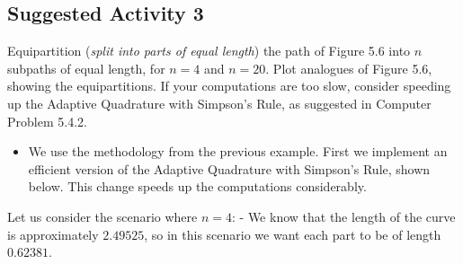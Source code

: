 \documentclass[11pt]{article}
\providecommand{\tightlist}{%
      \setlength{\itemsep}{0pt}\setlength{\parskip}{0pt}}
\begin{document}
    \subsection{Suggested Activity 3}\label{suggested-activity-3}

Equipartition (\emph{split into parts of equal length}) the path of
Figure 5.6 into \(n\) subpaths of equal length, for \(n = 4\) and
\(n = 20\). Plot analogues of Figure 5.6, showing the equipartitions. If
your computations are too slow, consider speeding up the Adaptive
Quadrature with Simpson's Rule, as suggested in Computer Problem 5.4.2.

\begin{itemize}
\tightlist
\item
  We use the methodology from the previous example. First we implement
  an efficient version of the Adaptive Quadrature with Simpson's Rule,
  shown below. This change speeds up the computations considerably.
\end{itemize}

Let us consider the scenario where \(n = 4\): - We know that the length
of the curve is approximately \(2.49525\), so in this scenario we want
each part to be of length \(0.62381\).
\end{document}
